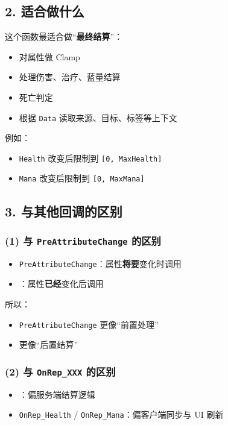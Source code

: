 \documentclass[10pt,CJKmath]{ctexart}
\begin{document}
\subsection{2. 适合做什么}

这个函数最适合做“\textbf{最终结算}”：

\begin{itemize}
	\item 对属性做 Clamp
	\item 处理伤害、治疗、蓝量结算
	\item 死亡判定
	\item 根据 \verb|Data| 读取来源、目标、标签等上下文
\end{itemize}

例如：
\begin{itemize}
	\item \verb|Health| 改变后限制到 \verb|[0, MaxHealth]|
	\item \verb|Mana| 改变后限制到 \verb|[0, MaxMana]|
\end{itemize}

\subsection{3. 与其他回调的区别}

\subsubsection{(1) 与 \texttt{PreAttributeChange} 的区别}

\begin{itemize}
	\item \verb|PreAttributeChange|：属性\textbf{将要}变化时调用
	\item {}：属性\textbf{已经}变化后调用
\end{itemize}

所以：

\begin{itemize}
	\item \verb|PreAttributeChange| 更像“前置处理”
	\item {} 更像“后置结算”
\end{itemize}

\subsubsection{(2) 与 \texttt{OnRep\_XXX} 的区别}

\begin{itemize}
	\item {}：偏服务端结算逻辑
	\item \verb|OnRep_Health| / \verb|OnRep_Mana|：偏客户端同步与 UI 刷新
\end{itemize}
\end{document}
